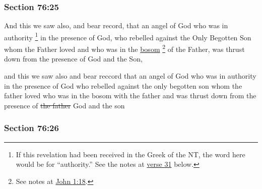 	\subsubsection{Section 76:25} %
		\label{DC76-25}

		And this we saw also, and bear record, that an angel of God who was in authority%
			\footnote{%
				\label{DC76-25-authority}%
				If this revelation had been received in the Greek of the NT, the word here would be \hyperref[EXOUSIA]{} for ``authority.'' See the notes at \hyperref[DC76-31]{verse 31} below.
				}
		in the presence of God, who rebelled against the Only Begotten Son whom the Father loved and who was in the \hyperref[BOSOM]{bosom}%
			\footnote{%
				See notes at \hyperref[JOHN-1-18]{John 1:18}.
				}
		of the Father, was thrust down from the presence of God and the Son,

		\begin{framed}
		\scriptsize
			\begin{compactdesc}
				\item[JSP] and this we saw also and bear reccord that an angel of God who was in authority in the presence of God who rebelled against the only begotten son whom the father loved who was in the bosom with the father and was thrust down from the presence of \sout{the father} God and the son
			\end{compactdesc}
		\end{framed}

	\subsubsection{Section 76:26} %
		\label{DC76-26}

